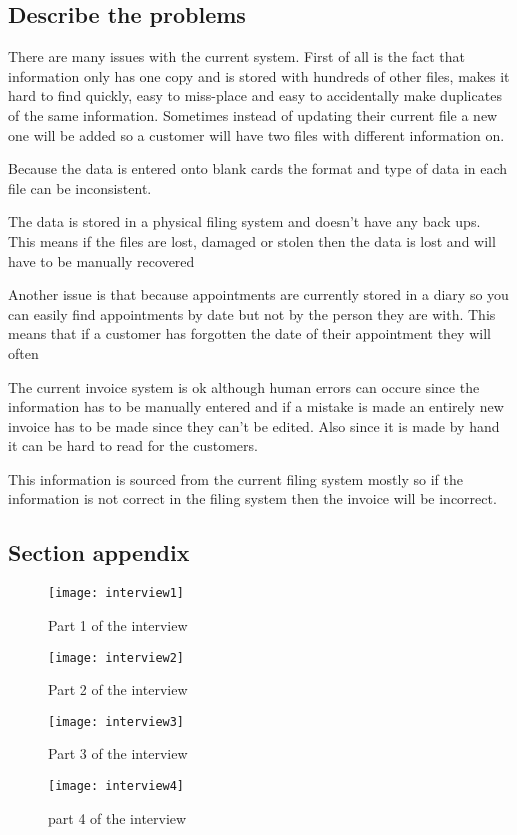 	\subsection{Describe the problems}
	
		There are many issues with the current system. First of all is the fact that information only has one copy and is stored with hundreds of other files, makes it hard to find quickly, 			easy to miss-place and easy to accidentally make duplicates of the same information. 
		Sometimes instead of updating their current file a new one will be added so a customer will have two files with different information on.

		Because the data is entered onto blank cards the format and type of data in each file can be inconsistent.

		The data is stored in a physical filing system and doesn't have any back ups. This means if the files are lost, damaged or stolen then the data is lost and will have to be manually 			recovered
		

		Another issue is that because appointments are currently stored in a diary so you can easily find appointments by date but not by the person they are with. This means that if a 			customer has forgotten the date of their appointment they will often

		The current invoice system is ok although human errors can occure since the information has to be manually entered and if a mistake is made an entirely new invoice has to be 			made since they can't be edited. Also since it is made by hand it can be hard to read for the customers.

This information is sourced from the current filing system
		mostly so if the information is not correct in the filing system then the invoice will be incorrect.


\subsection{Section appendix}
		
\begin{figure}[H]
		
\texttt{[image: interview1]}
\caption{Part 1 of the interview}

\end{figure}	
\newpage
\begin{figure}[H]


\texttt{[image: interview2]}	
\caption{Part 2 of the interview}  

\end{figure}	
\newpage
\begin{figure}[H]

	  
\texttt{[image: interview3]}

\end{figure}	
\newpage
\begin{figure}[H]

\caption{Part 3 of the interview}	

\texttt{[image: interview4]} 
\caption{part 4 of the interview}
	 	  
\end{figure}

